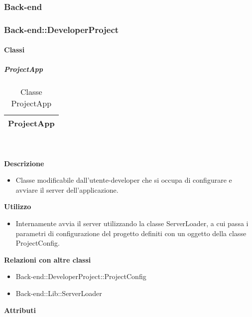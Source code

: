 
	\subsubsection{Back-end} 
	\subsubsection{Back-end::DeveloperProject} 
		\paragraph{Classi}
			\subparagraph{ProjectApp} 
\begin{table}[ht]
\begin{center}
\bgroup
	\setlength{\arrayrulewidth}{0.6mm}
	\def\arraystretch{1}
		\begin{tabular}{ | p{12cm} | }
				\hline  
					\centerline{\textbf{ProjectApp}}
		\\ \hline 
				\hline
				\hline
		
		\end{tabular}
\egroup
\caption{Classe ProjectApp}
\end{center}
\end{table}  \textbf{\\ \\ Descrizione} 
					\begin{itemize}
						\item[] Classe modificabile dall'utente-developer che si occupa di configurare e avviare il server dell'applicazione.
					\end{itemize}      
				\textbf{Utilizzo}  
					\begin{itemize}
						\item[] Internamente avvia il server utilizzando la classe ServerLoader, a cui passa i parametri di configurazione del progetto definiti con un oggetto della classe ProjectConfig.
					\end{itemize}
					\textbf{Relazioni con altre classi}
					\begin{itemize}
							\item{Back-end::DeveloperProject::ProjectConfig}
							\item{Back-end::Lib::ServerLoader}
					\end{itemize}
			 \textbf{Attributi} 
	\begin{itemize}
		\end{itemize}
		
